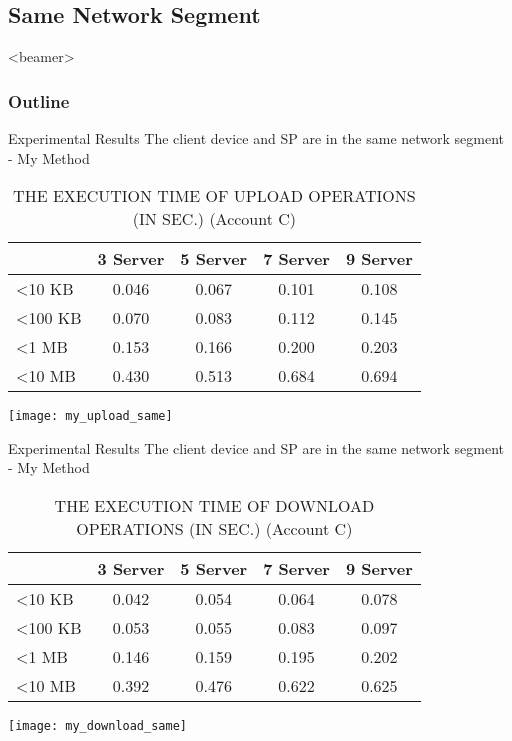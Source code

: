 \subsection{Same Network Segment}
\begin{frame}<beamer>
    \frametitle{Outline}
    \tableofcontents[currentsubsection]
\end{frame}

\begin{frame}{Experimental Results}
{The client device and SP are in the same network segment - My Method}
	\scriptsize
    \begin{table}[]
    \centering
    \caption{THE EXECUTION TIME OF \alert{UPLOAD} OPERATIONS (IN SEC.) (Account C)}
    \begin{tabular}{lcccc}
                         & 3 Server & 5 Server & 7 Server & 9 Server \\ \hline
        \textless 10 KB  & 0.046 & 0.067 & 0.101 & 0.108 \\ \hline
        \textless 100 KB & 0.070 & 0.083 & 0.112 & 0.145 \\ \hline
        \textless 1 MB   & 0.153 & 0.166 & 0.200 & 0.203 \\ \hline
        \textless 10 MB  & 0.430 & 0.513 & 0.684 & 0.694 \\ \hline
    \end{tabular}
    \end{table}
    \begin{center}
		\texttt{[image: my\_upload\_same]}
    \end{center}
\end{frame}

\begin{frame}{Experimental Results}
{The client device and SP are in the same network segment - My Method}
	\scriptsize
    \begin{table}[]
    \centering
    \caption{THE EXECUTION TIME OF \alert{DOWNLOAD} OPERATIONS (IN SEC.) (Account C)}
    \begin{tabular}{lcccc}
                         & 3 Server & 5 Server & 7 Server & 9 Server \\ \hline
        \textless 10 KB  & 0.042 & 0.054 & 0.064 & 0.078 \\ \hline
        \textless 100 KB & 0.053 & 0.055 & 0.083 & 0.097 \\ \hline
        \textless 1 MB   & 0.146 & 0.159 & 0.195 & 0.202 \\ \hline
        \textless 10 MB  & 0.392 & 0.476 & 0.622 & 0.625 \\ \hline
    \end{tabular}
    \end{table}
    \begin{center}
		\texttt{[image: my\_download\_same]}
    \end{center}
\end{frame}


